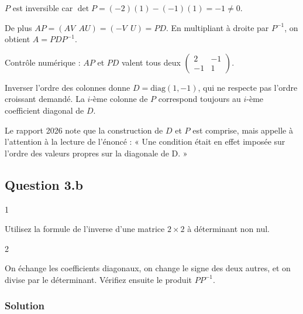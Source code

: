 \documentclass[11pt,a4paper]{article}
\begin{document}
\(P\) est inversible car \(\det P=(-2)(1)-(-1)(1)=-1\neq0\).

De plus \(AP=(AV\ \ AU)=(-V\ \ U)=PD\). En multipliant à droite par \(P^{-1}\), on obtient \(A=PDP^{-1}\).

Contrôle numérique : \(AP\) et \(PD\) valent tous deux \(\begin{pmatrix}2&-1\\-1&1\end{pmatrix}\).

\begin{piege}

Inverser l'ordre des colonnes donne \(D=\mathrm{diag}(1,-1)\), qui ne respecte pas l'ordre croissant demandé. La \(i\)-ème colonne de \(P\) correspond toujours au \(i\)-ème coefficient diagonal de \(D\).

\end{piege}

\begin{jury}

Le rapport 2026 note que la construction de \(D\) et \(P\) est comprise, mais appelle à l'attention à la lecture de l'énoncé : « Une condition était en effet imposée sur l'ordre des valeurs propres sur la diagonale de D. »

\end{jury}

\hypertarget{question-3.b}{%
\subsection{Question 3.b}\label{question-3.b}}

\begin{indication}{1}

Utilisez la formule de l'inverse d'une matrice \(2\times2\) à déterminant non nul.

\end{indication}

\begin{indication}{2}

On échange les coefficients diagonaux, on change le signe des deux autres, et on divise par le déterminant. Vérifiez ensuite le produit \(PP^{-1}\).

\end{indication}

\hypertarget{solution-4}{%
\subsubsection{Solution}\label{solution-4}}
\end{document}

